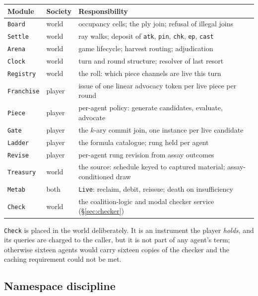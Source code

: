 \documentclass[11pt,a4paper]{article}
\theoremstyle{plain}
\theoremstyle{definition}
\theoremstyle{remark}
\begin{document}
\begin{center}
\begin{tabular}{@{}llp{6.6cm}@{}}
\toprule
Module & Society & Responsibility \\
\midrule
\texttt{Board}    & world  & occupancy cells; the ply join; refusal of illegal joins \\
\texttt{Settle}   & world  & ray walks; deposit of \texttt{atk}, \texttt{pin}, \texttt{chk}, \texttt{ep}, \texttt{cast} \\
\texttt{Arena}    & world  & game lifecycle; harvest routing; adjudication \\
\texttt{Clock}    & world  & turn and round structure; resolver of last resort \\
\texttt{Registry} & world  & the roll: which piece channels are live this turn \\
\texttt{Franchise}& player & issue of one linear advocacy token per live piece per round \\
\texttt{Piece}    & player & per-agent policy: generate candidates, evaluate, advocate \\
\texttt{Gate}     & player & the $k$-ary commit join, one instance per live candidate \\
\texttt{Ladder}   & player & the formula catalogue; rung held per agent \\
\texttt{Revise}   & player & per-agent rung revision from assay outcomes \\
\texttt{Treasury} & world  & the source: schedule keyed to captured material; assay-conditioned draw \\
\texttt{Metab}    & both   & \texttt{Live}: reclaim, debit, reissue; death on insufficiency \\
\texttt{Check}    & world  & the coalition-logic and modal checker service (\S\ref{sec:checker}) \\
\bottomrule
\end{tabular}
\end{center}

\texttt{Check} is placed in the world deliberately. It is an instrument the
player \emph{holds}, and its queries are charged to the caller, but it is not
part of any agent's term; otherwise sixteen agents would carry sixteen copies of
the checker and the caching requirement could not be met.

\subsection{Namespace discipline}
\label{sec:names}
\end{document}
